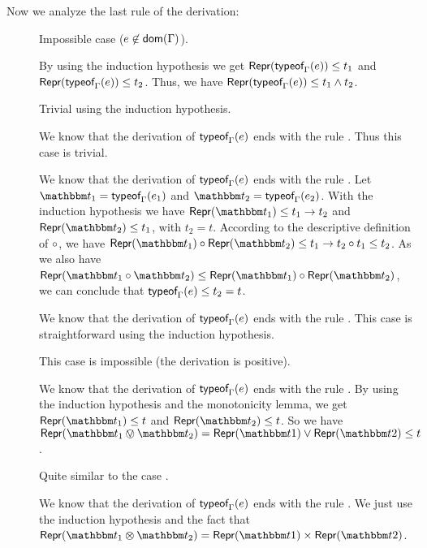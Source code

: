 \documentclass[a4paper]{article}
\theoremstyle{definition}
\begin{document}
  Now we analyze the last rule of the derivation:

  \begin{description}
    \item[] Impossible case ($e\not\in\textsf{dom}(\Gamma)$).
    \item[] By using the induction hypothesis we get $\textsf{Repr}(\textsf{typeof}_{\Gamma}(e)) \leq t_1$ and $\textsf{Repr}(\textsf{typeof}_{\Gamma}(e)) \leq t_2$.
    Thus, we have $\textsf{Repr}(\textsf{typeof}_{\Gamma}(e)) \leq t_1 \land t_2$. 
    \item[] Trivial using the induction hypothesis.
    \item[] We know that the derivation of $\textsf{typeof}_{\Gamma}(e)$ ends with the rule .
    Thus this case is trivial.
    \item[] We know that the derivation of $\textsf{typeof}_{\Gamma}(e)$ ends with the rule .
    Let $\ts_1 = \tyof {e_1} \Gamma$ and $\ts_2 = \tyof {e_2} \Gamma$. 
    With the induction hypothesis we have $\tsrep {\ts_1} \leq \arrow {t_1} {t_2}$ and $\tsrep {\ts_2} \leq t_1$, with $t_2=t$.
    According to the descriptive definition of $\circ$, we have
    $\apply{\tsrep {\ts_1}}{\tsrep {\ts_2}} \leq \apply{\arrow {t_1}{t_2}}{t_1} \leq t_2$.
    As we also have $\tsrep{\apply {\ts_1} {\ts_2}} \leq \apply{\tsrep {\ts_1}}{\tsrep {\ts_2}}$,
    we can conclude that $\textsf{typeof}_{\Gamma}(e) \leq t_2=t$.

    \item[] We know that the derivation of $\textsf{typeof}_{\Gamma}(e)$ ends with the rule .
    This case is straightforward using the induction hypothesis.
    \item[] This case is impossible (the derivation is positive).
    \item[] We know that the derivation of $\textsf{typeof}_{\Gamma}(e)$ ends with the rule .
    By using the induction hypothesis and the monotonicity lemma, we get $\tsrep{\ts_1}\leq t$ and $\tsrep{\ts_2}\leq t$.
    So we have $\tsrep{\ts_1\tsor\ts_2}=\tsrep{\ts1}\vee\tsrep{\ts2}\leq t$.
    \item[] Quite similar to the case .
    \item[] We know that the derivation of $\textsf{typeof}_{\Gamma}(e)$ ends with the rule .
    We just use the induction hypothesis and the fact that $\tsrep{\ts_1\tstimes\ts_2}=\pair {\tsrep{\ts1}} {\tsrep{\ts2}}$.
  \end{description}
\end{document}
